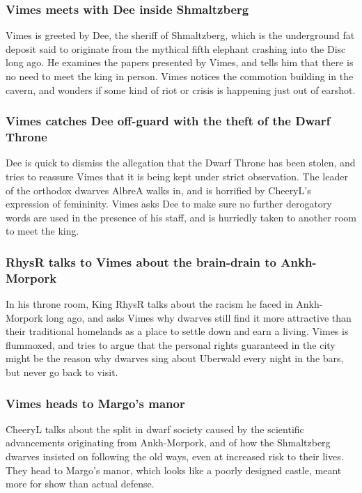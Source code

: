 \subsubsection{\Gls{Vimes} meets with \Gls{Dee} inside Shmaltzberg}
\Gls{Vimes} is greeted by \Gls{Dee}, the sheriff of Shmaltzberg, which is the underground fat
deposit said to originate from the mythical fifth elephant crashing into the Disc long ago. He
examines the papers presented by \Gls{Vimes}, and tells him that there is no need to meet the king
in person. \Gls{Vimes} notices the commotion building in the cavern, and wonders if some kind of
riot or crisis is happening just out of earshot.

\subsubsection{\Gls{Vimes} catches \Gls{Dee} off-guard with the theft of the Dwarf Throne}
\Gls{Dee} is quick to dismiss the allegation that the Dwarf Throne has been stolen, and tries to
reassure \Gls{Vimes} that it is being kept under strict observation. The leader of the orthodox
dwarves \Gls{AlbreA} walks in, and is horrified by \Gls{CheeryL}'s expression of femininity.
\Gls{Vimes} asks \Gls{Dee} to make sure no further derogatory words are used in the presence of his
staff, and is hurriedly taken to another room to meet the king.

\subsubsection{\Gls{RhysR} talks to \Gls{Vimes} about the brain-drain to Ankh-Morpork}
In his throne room, King \Gls{RhysR} talks about the racism he faced in Ankh-Morpork long ago, and
asks \Gls{Vimes} why dwarves still find it more attractive than their traditional homelands as a
place to settle down and earn a living. \Gls{Vimes} is flummoxed, and tries to argue that the
personal rights guaranteed in the city might be the reason why dwarves sing about Uberwald every
night in the bars, but never go back to visit.

\subsubsection{\Gls{Vimes} heads to \Gls{Margo}'s manor}
\Gls{CheeryL} talks about the split in dwarf society caused by the scientific advancements
originating from Ankh-Morpork, and of how the Shmaltzberg dwarves insisted on following the old
ways, even at increased risk to their lives. They head to \Gls{Margo}'s manor, which looks like a
poorly designed castle, meant more for show than actual defense.

